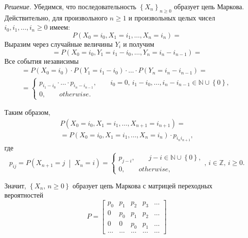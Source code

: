 \textit{Решение.}
Убедимся, что последовательность $ \left\{ X_n \right\}_{n \geq 0}$ образует цепь Маркова.
Действительно,
для произвольного $n \geq 1$ и произвольных целых чисел $i_0, i_1, \dotsc, i_n \geq 0$ имеем:
\begin{equation*}
  P \left( X_0 = i_0, X_1 = i_1, \dotsc, X_n = i_n \right) =
\end{equation*}
Выразим через случайные величины $Y_i$ и получим
\begin{equation*}
  = P \left( X_0 = i_0, Y_1 = i_1 - i_0, \dotsc, Y_n = i_n - i_{n - 1} \right) =
\end{equation*}
Все события независимы
\begin{gather*}
  = P \left( X_0 = i_0 \right) \cdot P \left( Y_1 = i_1 - i_0 \right) \cdot \dotsc \cdot
  P \left( Y_n = i_n - i_{n - 1} \right) = \\
  = \begin{cases}
    p_{i_1 - i_0} \cdot \dotsc \cdot p_{i_n - i_{n - 1}}, \qquad
    i_0 = 0, \, i_1 - i_0, \dotsc, i_n - i_{n - 1} \in \mathbb{N} \cup \left\{ 0 \right\}, \\
    0, \qquad otherwise.
  \end{cases}
\end{gather*}

Таким образом,
\begin{gather*}
  P \left( X_0 = i_0, X_1 = i_1, \dotsc, X_{n + 1} = i_{n + 1} \right) = \\
  = P \left( X_0 = i _0, X_1 = i_1, \dotsc, X_n = i_n \right) \cdot p_{i_n i_{n + 1}},
\end{gather*}
где
\begin{equation*}
  p_{ij} =
  P \left( X_{n + 1} = j \; \middle| \; X_n = i \right) =
  \begin{cases}
    p_{j - i}, \qquad j - i \in \mathbb{N} \cup \left\{ 0 \right\}, \\
    0, \qquad otherwise,
  \end{cases}, \, i \in \mathbb{Z}, \, i \geq 0.
\end{equation*}

Значит, $ \left\{ X_n, \, n \geq 0 \right\} $
образует цепь Маркова с матрицей переходных вероятностей
\begin{equation*}
  P =
  \begin{bmatrix}
    p_0 & p_1 & p_2 & p_3 & \dotsc \\
    0 & p_0 & p_1 & p_2 & \dotsc \\
    0 & 0 & p_0 & p_1 & \dotsc \\
    \dotsc & \dotsc & \dotsc & \dotsc & \dotsc
  \end{bmatrix}
\end{equation*}

